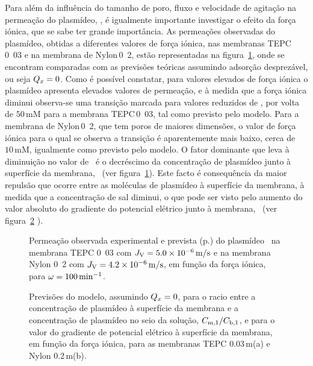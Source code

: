 Para além da influência do tamanho de poro, fluxo e velocidade de agitação na permeação do plasmídeo, \permobs, é igualmente importante investigar o efeito da força iónica, que se sabe ter grande importância. As permeações observadas do plasmídeo, obtidas a diferentes valores de força iónica, nas membranas TEPC\,\unit{0.03}{\micro\meter} e na membrana de Nylon\,\unit{0.2}{\micro\meter}, estão representadas na figura~\ref{fig:7art2}, onde se encontram comparadas com as previsões teóricas assumindo adsorção desprezável, ou seja $\cargamembrana=0$.
%
Como é possível constatar, para valores elevados de força iónica o plasmídeo apresenta elevados valores de permeação, e à medida que a força iónica diminui observa-se uma transição marcada para valores reduzidos de \permobs, por volta de $50\,\mathrm{mM}$ para a membrana TEPC\,\unit{0.03}{\micro\meter}, tal como previsto pelo modelo. Para a membrana de Nylon\,\unit{0.2}{\micro\meter}, que tem poros de maiores dimensões, o valor de força iónica para o qual se observa a transição é aparentemente mais baixo, cerca de $10\,\mathrm{mM}$, igualmente como previsto pelo modelo. O fator dominante que leva à diminuição no valor de \permobs\ é o decréscimo da concentração de plasmídeo junto à superfície da membrana, \concmum\ (ver figura~\ref{fig:7art2}). Este facto é consequência da maior repulsão que ocorre entre as moléculas de plasmídeo à superfície da membrana, à medida que a concentração de sal diminui, o que pode ser visto pelo aumento do valor absoluto do gradiente do potencial elétrico junto à membrana, \potencialgrad\ (ver figura~\ref{fig:8art2} ).
% 
\begin{figure}
	\centering
	\setlength\figureheight{6cm} 
	\setlength\figurewidth{6cm}
	
	\caption[Permeação observada do plasmídeo \pVAX\ em função da força iónica]{Permeação observada experimental e prevista (p.) do plasmídeo \pVAX\ na membrana TEPC \unit{0.03}{\micro\meter} com $J_{\mathrm{V}}=5.0\times 10^{-6}\,\mathrm{m}/\mathrm{s}$ e na membrana Nylon \unit{0.2}{\micro\meter} com $J_{\mathrm{V}}=4.2\times 10^{-6}\,\mathrm{m}/\mathrm{s}$, em função da força iónica, para $\omega=100\,\mathrm{min}^{-1}$.}
	\label{fig:7art2}
\end{figure}
\begin{figure}
	\centering
	\setlength\figureheight{5cm} 
	\setlength\figurewidth{5cm}
	
	\caption[Previsões do modelo para $\concmum/\concbum$, assumindo $\cargamembrana=0$]{Previsões do modelo, assumindo $\cargamembrana=0$, para o racio entre a concentração de plasmídeo à superfície da membrana e a concentração de plasmídeo no seio da solução, $\concmum/\concbum$, e para o valor do gradiente de potencial elétrico à superfície da membrana, em função da força iónica, para as membranas TEPC 0.03\,\micro m(a) e Nylon 0.2\,\micro m(b).}
	\label{fig:8art2}
\end{figure}

